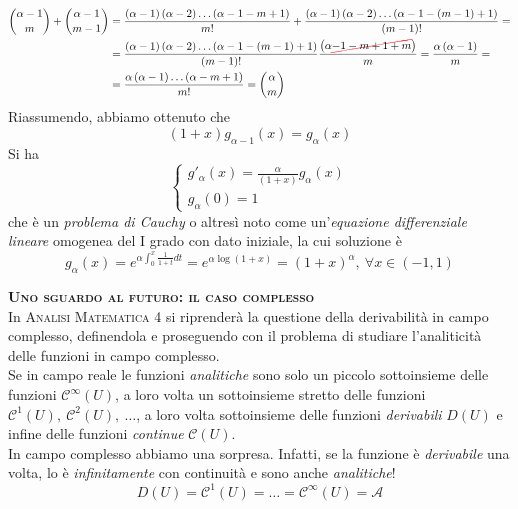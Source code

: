 \begin{demonstration}
\begin{itemize}
\begin{align*}
		\binom{\alpha-1}{m}+\binom{\alpha-1}{m-1}&=\frac{\left(\alpha-1\right)\left(\alpha-2\right)\ldots\left(\alpha-1-m+1\right)}{m!}+\frac{\left(\alpha-1\right)\left(\alpha-2\right)\ldots\left(\alpha-1-\left(m-1\right)+1\right)}{\left(m-1\right)!}=\\
		&=\frac{\left(\alpha-1\right)\left(\alpha-2\right)\ldots\left(\alpha-1-\left(m-1\right)+1\right)}{\left(m-1\right)!}\frac{\left(\alpha\Ccancel[red]{-1-m+1+m}\right)}{m}=\frac{\alpha\left(\alpha-1\right)}{m}=\\
		&=\frac{\alpha\left(\alpha-1\right)\ldots\left(\alpha-m+1\right)}{m!}=\binom{\alpha}{m}
	\end{align*}
Riassumendo, abbiamo ottenuto che
\begin{equation*}
	\left(1+x\right)g_{\alpha-1}\left(x\right)=g_\alpha\left(x\right)
\end{equation*}
Si ha
\begin{equation*}
	\begin{cases}
		g'_{\alpha}\left(x\right)=\frac{\alpha}{\left(1+x\right)}g_{\alpha}\left(x\right)\\
		g_{\alpha}\left(0\right)=1
	\end{cases}
\end{equation*}
che è un \textit{problema di Cauchy} o altresì noto come un'\textit{equazione differenziale lineare} omogenea del I grado con dato iniziale, la cui soluzione è
\begin{equation*}
	g_{\alpha}\left(x\right)=e^{\alpha\int_{0}^{x}\frac{1}{1+t}dt}=e^{\alpha\log\left(1+x\right)}=\left(1+x\right)^{\alpha},\ \forall x\in\left(-1,1\right)
\end{equation*}
\end{itemize}
\end{demonstration}
\begin{digression}\textsc{\textbf{Uno sguardo al futuro: il caso complesso}}\\
	In \textsc{Analisi Matematica 4} si riprenderà la questione della derivabilità in campo complesso, definendola e proseguendo con il problema di studiare l'analiticità delle funzioni in campo complesso.\\
	Se in campo reale le funzioni \textit{analitiche} sono solo un piccolo sottoinsieme delle funzioni $\mathcal{C}^{\infty}\left(U\right)$, a loro volta un sottoinsieme stretto delle funzioni $\mathcal{C}^1\left(U\right),\ \mathcal{C}^2\left(U\right),\ \ldots$, a loro volta sottoinsieme delle funzioni \textit{derivabili} $D\left(U\right)$ e infine delle funzioni \textit{continue} $\mathcal{C}\left(U\right)$.\\
	In campo complesso abbiamo una sorpresa. Infatti, se la funzione è \textit{derivabile} una volta, lo è \textit{infinitamente} con continuità e sono anche \textit{analitiche}!
	\begin{equation*}
		D\left(U\right)=\mathcal{C}^1\left(U\right)=\ldots=\mathcal{C}^{\infty}\left(U\right)=\mathcal{A}
	\end{equation*}
\end{digression}
